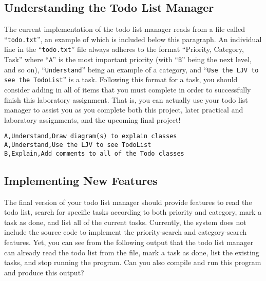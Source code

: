 \vspace{-0.1in}
\subsection*{Understanding the Todo List Manager}
\vspace{-0.05in}

The current implementation of the todo list manager reads from a file called ``{\tt todo.txt}'', an example of which is
included below this paragraph. An individual line in the ``{\tt todo.txt}'' file always adheres to the format
``Priority, Category, Task'' where ``{\tt A}'' is the most important priority (with ``{\tt B}'' being the next level,
  and so on), ``{\tt Understand}'' being an example of a category, and ``{\tt Use the LJV to see the TodoList}'' is a
task.  Following this format for a task, you should consider adding in all of items that you must complete in order to
successfully finish this laboratory assignment. That is, you can actually use your todo list manager to assist you as
you complete both this project, later practical and laboratory assignments, and the upcoming final project!

\vspace{-0.05in}
\begin{verbatim}
A,Understand,Draw diagram(s) to explain classes
A,Understand,Use the LJV to see TodoList
B,Explain,Add comments to all of the Todo classes
\end{verbatim}
\vspace{-0.05in}

\vspace{-0.15in}
\subsection*{Implementing New Features}
\vspace{-0.05in}

The final version of your todo list manager should provide features to read the todo list, search for specific tasks
according to both priority and category, mark a task as done, and list all of the current tasks.  Currently, the system
does not include the source code to implement the priority-search and category-search features. Yet, you can see
from the following output that the todo list manager can already read the todo list from the file, mark a task as done,
list the existing tasks, and stop running the program. Can you also compile and run this program and produce this
output?

